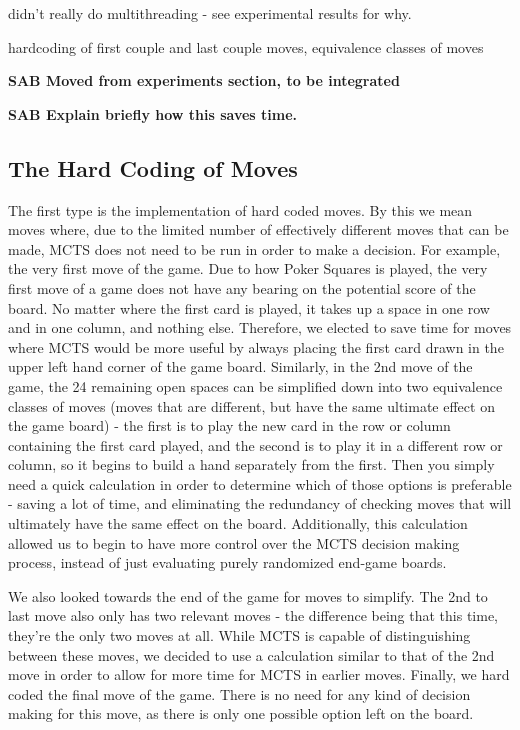 \documentclass[letterpaper]{article}
\begin{document}
didn't really do multithreading - see experimental results for why.

hardcoding of first couple and last couple moves, equivalence classes of moves

{\bf SAB Moved from experiments section, to be integrated}

{\bf SAB Explain briefly how this saves time.}

\subsection{The Hard Coding of Moves}
The first type is the implementation of hard coded moves. By this we mean moves where, due to the limited number of effectively different moves that can be made, MCTS does not need to be run in order to make a decision. For example, the very first move of the game. Due to how Poker Squares is played, the very first move of a game does not have any bearing on the potential score of the board. No matter where the first card is played, it takes up a space in one row and in one column, and nothing else. Therefore, we elected to save time for moves where MCTS would be more useful by always placing the first card drawn in the upper left hand corner of the game board.
Similarly, in the 2nd move of the game, the 24 remaining open spaces can be simplified down into two equivalence classes of moves (moves that are different, but have the same ultimate effect on the game board) - the first is to play the new card in the row or column containing the first card played, and the second is to play it in a different row or column, so it begins to build a hand separately from the first. Then you simply need a quick calculation in order to determine which of those options is preferable - saving a lot of time, and eliminating the redundancy of checking moves that will ultimately have the same effect on the board. Additionally, this calculation allowed us to begin to have more control over the MCTS decision making process, instead of just evaluating purely randomized end-game boards.

We also looked towards the end of the game for moves to simplify. The 2nd to last move also only has two relevant moves - the difference being that this time, they’re the only two moves at all. While MCTS is capable of distinguishing between these moves, we decided to use a calculation similar to that of the 2nd move in order to allow for more time for MCTS in earlier moves.
Finally, we hard coded the final move of the game. There is no need for any kind of decision making for this move, as there is only one possible option left on the board.
\end{document}

